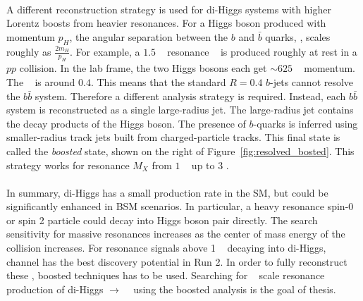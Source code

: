 \paragraph{}
A different reconstruction strategy is used for di-Higgs systems with higher Lorentz boosts from heavier resonances.
For a Higgs boson produced with momentum $p_{H}$, the angular separation between the $b$ and $\bar{b}$ quarks, \drbb, scales roughly as $\frac{2m_H}{p_{H}}$.
For example, a $1.5$ \TeV~ resonance \Grav~ is produced roughly at rest in a $pp$ collision. 
In the lab frame, the two Higgs bosons each get $\sim 625$ \GeV~ momentum. 
The \drbb~ is around $0.4$.
This means that the standard $R=0.4$ $b$-jets cannot resolve the $b\bar{b}$ system.
Therefore a different analysis strategy is required.
Instead, each $b\bar{b}$ system is reconstructed as a single large-radius jet.
The large-radius jet contains the decay products of the Higgs boson.
The presence of $b$-quarks is inferred using smaller-radius track jets built from charged-particle tracks.
This final state is called the \textit{boosted} state, shown on the right of Figure~\ref{fig:resolved_bosted}.
This strategy works for resonance $M_X$ from $1$ \GeV~ up to $3$ \TeV.

\paragraph{}
In summary, di-Higgs has a small production rate in the SM, but could be significantly enhanced in BSM scenarios. 
In particular, a heavy resonance spin-0 or spin 2 particle could decay into Higgs boson pair directly. 
The search sensitivity for massive resonances increases as the center of mass energy of the collision increases. 
For resonance signals above 1 \TeV~ decaying into di-Higgs, \bbbb~ channel has the best discovery potential in Run 2. 
In order to fully reconstruct these \Xtohhb, boosted techniques has to be used. 
Searching for \TeV~ scale resonance production of di-Higgs $\to$ \bbbb~ using the boosted analysis is the goal of thesis.



